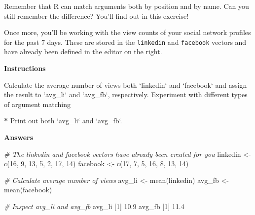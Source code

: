 \documentclass[]{article}
\newcommand{\hlnum}[1]{\textcolor[rgb]{0.816,0.125,0.439}{#1}}%
\newcommand{\hlstr}[1]{\textcolor[rgb]{0.251,0.627,0.251}{#1}}%
\newcommand{\hlcom}[1]{\textcolor[rgb]{0.502,0.502,0.502}{\textit{#1}}}%
\newcommand{\hlstd}[1]{\textcolor[rgb]{0.251,0.251,0.251}{#1}}%
\newcommand{\hlkwc}[1]{\textcolor[rgb]{0.251,0.251,0.251}{#1}}%
\newcommand{\hlkwd}[1]{\textcolor[rgb]{0.878,0.439,0.125}{#1}}%
\newenvironment{Shaded}{\begin{myshaded}}{\end{myshaded}}
\newcommand{\KeywordTok}[1]{\hlkwd{#1}}
\newcommand{\DataTypeTok}[1]{\hlkwc{#1}}
\newcommand{\DecValTok}[1]{\hlnum{#1}}
\newcommand{\FloatTok}[1]{\hlnum{#1}}
\newcommand{\StringTok}[1]{\hlstr{#1}}
\newcommand{\CommentTok}[1]{\hlcom{#1}}
\newcommand{\ErrorTok}[1]{\textbf{{#1}}}
\newcommand{\NormalTok}[1]{\hlstd{#1}}
\begin{document}
Remember that R can match arguments both by position and by name. Can
you still remember the difference? You'll find out in this exercise!

Once more, you'll be working with the view counts of your social network
profiles for the past 7 days. These are stored in the \texttt{linkedin}
and \texttt{facebook} vectors and have already been defined in the
editor on the right.

\textbf{Instructions}

\begin{Shaded}
\begin{Highlighting}[]
\OperatorTok{*}\StringTok{ }\NormalTok{Calculate the average number of views }\NormalTok{ both }\StringTok{`}\DataTypeTok{linkedin}\StringTok{`}\NormalTok{ and }\StringTok{`}\DataTypeTok{facebook}\StringTok{`}\NormalTok{ and assign the result to }\StringTok{`}\DataTypeTok{avg_li}\StringTok{`}\NormalTok{ and }\StringTok{`}\DataTypeTok{avg_fb}\StringTok{`}\NormalTok{, respectively. Experiment with different types of argument matching}\OperatorTok{!}

\ErrorTok{*}\StringTok{ }\NormalTok{Print out both }\StringTok{`}\DataTypeTok{avg_li}\StringTok{`}\NormalTok{ and }\StringTok{`}\DataTypeTok{avg_fb}\StringTok{`}\NormalTok{.}
\end{Highlighting}
\end{Shaded}

\textbf{Answers}

\begin{Shaded}
\begin{Highlighting}[]
\CommentTok{# The linkedin and facebook vectors have already been created for you}
\NormalTok{linkedin <-}\StringTok{ }\KeywordTok{c}\NormalTok{(}\DecValTok{16}\NormalTok{, }\DecValTok{9}\NormalTok{, }\DecValTok{13}\NormalTok{, }\DecValTok{5}\NormalTok{, }\DecValTok{2}\NormalTok{, }\DecValTok{17}\NormalTok{, }\DecValTok{14}\NormalTok{)}
\NormalTok{facebook <-}\StringTok{ }\KeywordTok{c}\NormalTok{(}\DecValTok{17}\NormalTok{, }\DecValTok{7}\NormalTok{, }\DecValTok{5}\NormalTok{, }\DecValTok{16}\NormalTok{, }\DecValTok{8}\NormalTok{, }\DecValTok{13}\NormalTok{, }\DecValTok{14}\NormalTok{)}

\CommentTok{# Calculate average number of views}
\NormalTok{avg_li <-}\StringTok{ }\KeywordTok{mean}\NormalTok{(linkedin)}
\NormalTok{avg_fb <-}\StringTok{ }\KeywordTok{mean}\NormalTok{(facebook)}

\CommentTok{# Inspect avg_li and avg_fb}
\NormalTok{avg_li}
\NormalTok{   [}\DecValTok{1}\NormalTok{] }\FloatTok{10.9}
\NormalTok{avg_fb}
\NormalTok{   [}\DecValTok{1}\NormalTok{] }\FloatTok{11.4}
\end{Highlighting}
\end{Shaded}
\end{document}
